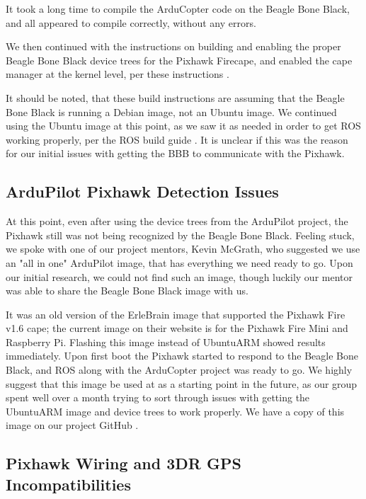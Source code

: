 \documentclass[IEEEtran,letterpaper,10pt,notitlepage,draftclsnofoot]{article}
\begin{document}
It took a long time to compile the ArduCopter code on the Beagle Bone Black, and all appeared to compile
correctly, without any errors.

We then continued with the instructions on building and enabling the proper Beagle Bone Black device trees
for the Pixhawk Firecape, and enabled the cape manager at the kernel level, per these instructions \cite{ArduGuideDeviceTrees}.

It should be noted, that these build instructions are assuming that the Beagle Bone Black is running a Debian
image, not an Ubuntu image. We continued using the Ubuntu image at this point, as we saw it as needed in order
to get ROS working properly, per the ROS build guide \cite{ROSBBBUbuntu}. It is unclear if
this was the reason for our initial issues with getting the BBB to communicate with the Pixhawk.

\subsection{ArduPilot Pixhawk Detection Issues}

At this point, even after using the device trees from the ArduPilot project, the Pixhawk still was not being
recognized by the Beagle Bone Black. Feeling stuck, we spoke with one of our project mentors, Kevin McGrath,
who suggested we use an "all in one" ArduPilot image, that has everything we need ready to go.
Upon our initial research, we could not find such an image, though luckily our mentor was able to share the
Beagle Bone Black image with us.

It was an old version of the ErleBrain image that supported the Pixhawk Fire v1.6 cape; the current image on
their website is for the Pixhawk Fire Mini and Raspberry Pi. Flashing this image instead of UbuntuARM showed
results immediately. Upon first boot the Pixhawk started to respond to the Beagle Bone Black, and ROS along
with the ArduCopter project was ready to go. We highly suggest that this image be used at as a starting point
in the future, as our group spent well over a month trying to sort through issues with getting the UbuntuARM
image and device trees to work properly. We have a copy of this image on our project GitHub \cite{ErleBrainAIOImage}.

\subsection{Pixhawk Wiring and 3DR GPS Incompatibilities}
\end{document}
